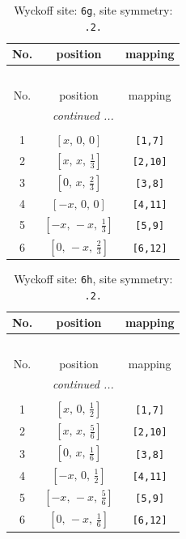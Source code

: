 \documentclass[fleqn,8pt]{jsarticle}
\begin{document}
\renewcommand{\arraystretch}{1.2}
\begin{longtable}{ccc}
\caption{Wyckoff site: {\tt 6g}, site symmetry: {\tt .2.}}
 \\
 \hline \hline
No. & position & mapping \\ \hline \endfirsthead

\multicolumn{2}{l}{\tablename\ \thetable{}} \\
 \hline \hline
No. & position & mapping \\ \hline \endhead

 \hline \hline
\multicolumn{2}{r}{\footnotesize\it continued ...} \\ \endfoot

 \hline \hline
\multicolumn{2}{r}{} \\ \endlastfoot

1 & $\left[ x,\, 0,\, 0 \right]$ & {\tt [1,7]} \\ \hline
2 & $\left[ x,\, x,\, \frac{1}{3} \right]$ & {\tt [2,10]} \\ \hline
3 & $\left[ 0,\, x,\, \frac{2}{3} \right]$ & {\tt [3,8]} \\ \hline
4 & $\left[ - x,\, 0,\, 0 \right]$ & {\tt [4,11]} \\ \hline
5 & $\left[ - x,\, - x,\, \frac{1}{3} \right]$ & {\tt [5,9]} \\ \hline
6 & $\left[ 0,\, - x,\, \frac{2}{3} \right]$ & {\tt [6,12]} \\
\end{longtable}
\renewcommand{\arraystretch}{1.2}
\begin{longtable}{ccc}
\caption{Wyckoff site: {\tt 6h}, site symmetry: {\tt .2.}}
 \\
 \hline \hline
No. & position & mapping \\ \hline \endfirsthead

\multicolumn{2}{l}{\tablename\ \thetable{}} \\
 \hline \hline
No. & position & mapping \\ \hline \endhead

 \hline \hline
\multicolumn{2}{r}{\footnotesize\it continued ...} \\ \endfoot

 \hline \hline
\multicolumn{2}{r}{} \\ \endlastfoot

1 & $\left[ x,\, 0,\, \frac{1}{2} \right]$ & {\tt [1,7]} \\ \hline
2 & $\left[ x,\, x,\, \frac{5}{6} \right]$ & {\tt [2,10]} \\ \hline
3 & $\left[ 0,\, x,\, \frac{1}{6} \right]$ & {\tt [3,8]} \\ \hline
4 & $\left[ - x,\, 0,\, \frac{1}{2} \right]$ & {\tt [4,11]} \\ \hline
5 & $\left[ - x,\, - x,\, \frac{5}{6} \right]$ & {\tt [5,9]} \\ \hline
6 & $\left[ 0,\, - x,\, \frac{1}{6} \right]$ & {\tt [6,12]} \\
\end{longtable}
\end{document}
